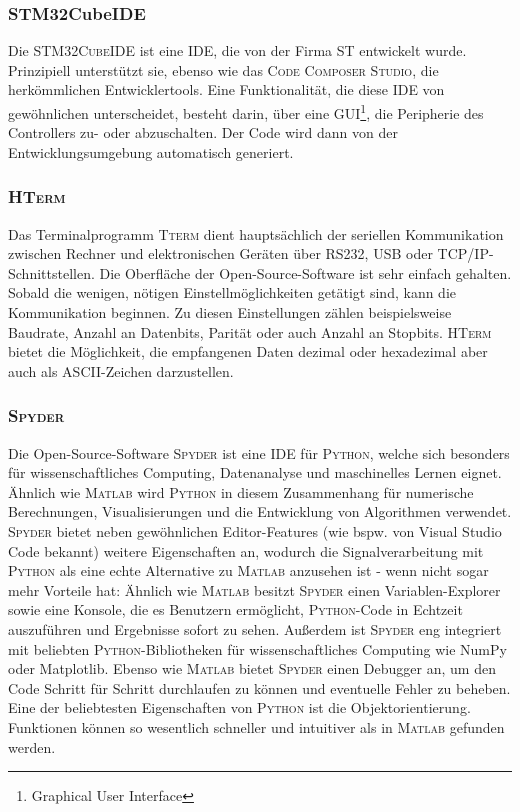 \documentclass[
	letterpaper, %
	10pt, %
]{CSUniSchoolLabReport}
\begin{document}
\begin{spacing}{1.6}
\subsubsection{STM32CubeIDE}
Die \textsc{STM32CubeIDE} ist eine IDE, die von der Firma \textsc{ST} entwickelt wurde. Prinzipiell unterstützt sie, ebenso wie das \textsc{Code Composer Studio}, die herkömmlichen Entwicklertools. Eine Funktionalität, die diese IDE von gewöhnlichen unterscheidet, besteht darin, über eine GUI\footnote{Graphical User Interface}, die Peripherie des Controllers zu- oder abzuschalten. Der Code wird dann von der Entwicklungsumgebung automatisch generiert.

\subsubsection{\textsc{HTerm}}
Das Terminalprogramm \textsc{Tterm} dient hauptsächlich der seriellen Kommunikation zwischen Rechner und elektronischen Geräten über RS232, USB oder TCP/IP-Schnittstellen. Die Oberfläche der Open-Source-Software ist sehr einfach gehalten. Sobald die wenigen, nötigen Einstellmöglichkeiten getätigt sind, kann die Kommunikation beginnen. Zu diesen Einstellungen zählen beispielsweise Baudrate, Anzahl an Datenbits, Parität oder auch Anzahl an Stopbits. \textsc{HTerm} bietet die Möglichkeit, die empfangenen Daten dezimal oder hexadezimal aber auch als ASCII-Zeichen darzustellen.

\subsubsection{\textsc{Spyder}}
Die Open-Source-Software \textsc{Spyder} ist eine IDE für \textsc{Python}, welche sich besonders für wissenschaftliches Computing, Datenanalyse und maschinelles Lernen eignet.\\
Ähnlich wie \textsc{Matlab} wird \textsc{Python} in diesem Zusammenhang für numerische Berechnungen, Visualisierungen und die Entwicklung von Algorithmen verwendet. \textsc{Spyder} bietet neben gewöhnlichen Editor-Features (wie bspw. von Visual Studio Code bekannt) weitere Eigenschaften an, wodurch die Signalverarbeitung mit \textsc{Python} als eine echte Alternative zu \textsc{Matlab} anzusehen ist - wenn nicht sogar mehr Vorteile hat: Ähnlich wie \textsc{Matlab} besitzt \textsc{Spyder} einen Variablen-Explorer sowie eine Konsole, die es Benutzern ermöglicht, \textsc{Python}-Code in Echtzeit auszuführen und Ergebnisse sofort zu sehen. Außerdem ist \textsc{Spyder} eng integriert mit beliebten \textsc{Python}-Bibliotheken für wissenschaftliches Computing wie NumPy oder Matplotlib. Ebenso wie \textsc{Matlab} bietet \textsc{Spyder} einen Debugger an, um den Code Schritt für Schritt durchlaufen zu können und eventuelle Fehler zu beheben.\\
Eine der beliebtesten Eigenschaften von \textsc{Python} ist die Objektorientierung. Funktionen können so wesentlich schneller und intuitiver als in \textsc{Matlab} gefunden werden.


\end{spacing}
\end{document}
